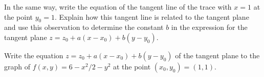 \begin{activity}
\item In the same way, write the equation of the tangent line of the
  trace with $x=1$ at the point $y_0=1$.  Explain how this tangent
  line is related to the tangent plane and use this observation to
  determine the constant $b$ in the expression for the tangent plane
  $z=z_0+a(x-x_0) + b(y-y_0)$.

\item Write the equation $z=z_0 + a(x-x_0) + b(y-y_0)$ of the tangent
  plane to the graph of $f(x,y)=6-x^2/2 - y^2$ at the point
  $(x_0,y_0)=(1,1)$. 

\ea

\end{activity}
\aftera

